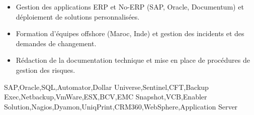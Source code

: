 \begin{experiences}
{\begin{itemize}
                        \item Gestion des applications ERP et No-ERP (SAP, Oracle, Documentum) et déploiement de solutions personnalisées.
                        \item Formation d'équipes offshore (Maroc, Inde) et gestion des incidents et des demandes de changement.
                        \item Rédaction de la documentation technique et mise en place de procédures de gestion des risques.
                      \end{itemize}
                  }
                  {SAP,Oracle,SQL,Automator,Dollar Universe,Sentinel,CFT,Backup Exec,Netbackup,VmWare,ESX,BCV,EMC Snapshot,VCB,Enabler Solution,Nagios,Dyamon,UniqPrint,CRM360,WebSphere,Application Server}
\end{experiences}
